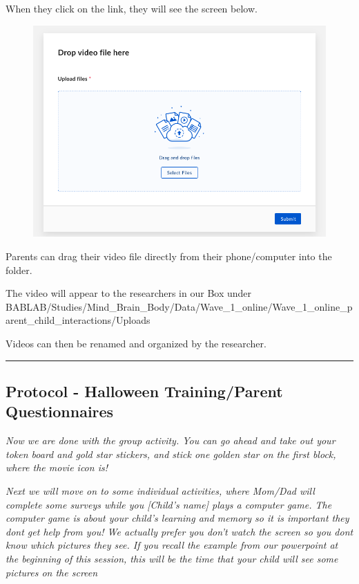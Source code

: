 \documentclass[]{book}
\begin{document}
When they click on the link, they will see the screen below.

\begin{figure}
\centering
\includegraphics{images/zoom_parent_child_interaction/13.png}
\caption{}
\end{figure}

Parents can drag their video file directly from their phone/computer into the folder.

The video will appear to the researchers in our Box under BABLAB/Studies/Mind\_Brain\_Body/Data/Wave\_1\_online/Wave\_1\_online\_parent\_child\_interactions/Uploads

Videos can then be renamed and organized by the researcher.

\begin{center}\rule{0.5\linewidth}{0.5pt}\end{center}

\hypertarget{protocol---halloween-trainingparent-questionnaires}{%
\subsection{Protocol - Halloween Training/Parent Questionnaires}\label{protocol---halloween-trainingparent-questionnaires}}

\emph{Now we are done with the group activity. You can go ahead and take out your token board and gold star stickers, and stick one golden star on the first block, where the movie icon is!}

\emph{Next we will move on to some individual activities, where Mom/Dad will complete some surveys while you {[}Child's name{]} plays a computer game. The computer game is about your child's learning and memory so it is important they dont get help from you! We actually prefer you don't watch the screen so you dont know which pictures they see. If you recall the example from our powerpoint at the beginning of this session, this will be the time that your child will see some pictures on the screen}
\end{document}
